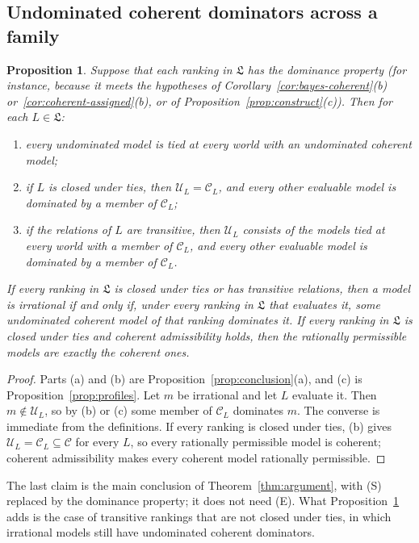 \documentclass[11pt]{article}
\newtheorem{proposition}[theorem]{Proposition}
\theoremstyle{definition}
\theoremstyle{remark}
\newcommand{\C}{\mathcal C}
\newcommand{\U}{\mathcal U}
\newcommand{\Lf}{\mathfrak L}
\begin{document}
\subsection{Undominated coherent dominators across a family}
\begin{proposition}\label{prop:permissible}
Suppose that each ranking in $\Lf$ has the dominance property (for instance, because it meets the hypotheses of Corollary~\ref{cor:bayes-coherent}(b) or~\ref{cor:coherent-assigned}(b), or of Proposition~\ref{prop:construct}(c)). Then for each $L\in\Lf$:
\begin{enumerate}[label=(\alph*)]
\item every undominated model is tied at every world with an undominated coherent model;
\item if $L$ is closed under ties, then $\U_L=\C_L$, and every other evaluable model is dominated by a member of $\C_L$;
\item if the relations of $L$ are transitive, then $\U_L$ consists of the models tied at every world with a member of $\C_L$, and every other evaluable model is dominated by a member of $\C_L$.
\end{enumerate}
If every ranking in $\Lf$ is closed under ties or has transitive relations, then a model is irrational if and only if, under every ranking in $\Lf$ that evaluates it, some undominated coherent model of that ranking dominates it. If every ranking in $\Lf$ is closed under ties and coherent admissibility holds, then the rationally permissible models are exactly the coherent ones.
\end{proposition}
\begin{proof}
Parts (a) and (b) are Proposition~\ref{prop:conclusion}(a), and (c) is Proposition~\ref{prop:profiles}. Let $m$ be irrational and let $L$ evaluate it. Then $m\notin\U_L$, so by (b) or (c) some member of $\C_L$ dominates $m$. The converse is immediate from the definitions. If every ranking is closed under ties, (b) gives $\U_L=\C_L\subseteq\C$ for every $L$, so every rationally permissible model is coherent; coherent admissibility makes every coherent model rationally permissible.
\end{proof}
The last claim is the main conclusion of Theorem~\ref{thm:argument}, with (S) replaced by the dominance property; it does not need (E). What Proposition~\ref{prop:permissible} adds is the case of transitive rankings that are not closed under ties, in which irrational models still have undominated coherent dominators.
\end{document}
